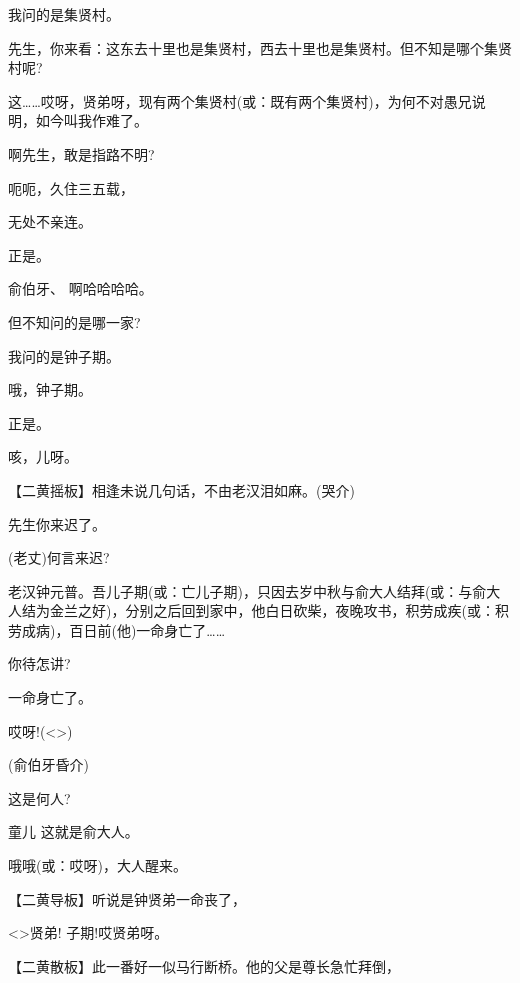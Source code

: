 { 我问的是集贤村。

 先生，你来看：这东去十里也是集贤村，西去十里也是集贤村。但不知是哪个集贤村呢?

 这\ldots{}\ldots{}哎呀，贤弟呀，现有两个集贤村(或：既有两个集贤村)，为何不对愚兄说明，如今叫我作难了。

 啊先生，敢是指路不明?

 呃呃，久住三五载，

 无处不亲连。

 正是。

俞伯牙、 啊哈哈哈哈。

 但不知问的是哪一家?

 我问的是钟子期。

 哦，钟子期。

 正是。

 咳，儿呀。

 【二黄摇板】相逢未说几句话，不由老汉泪如麻。(哭介)

 先生你来迟了。

 (老丈)何言来迟?

 老汉钟元普。吾儿子期(或：亡儿子期)，只因去岁中秋与俞大人结拜(或：与俞大人结为金兰之好)，分别之后回到家中，他白日砍柴，夜晚攻书，积劳成疾(或：积劳成病)，百日前(他)一命身亡了\ldots{}\ldots{}

 你待怎讲?

 一命身亡了。

 哎呀!(\textless{}\!\textgreater{})

(俞伯牙昏介)

 这是何人?

童儿 这就是俞大人。

 哦哦(或：哎呀)，大人醒来。

 【二黄导板】听说是钟贤弟一命丧了，

 \textless{}\!\textgreater{}贤弟! 子期!哎贤弟呀。

 【二黄散板】此一番好一似马行断桥。他的父是尊长急忙拜倒，

}
